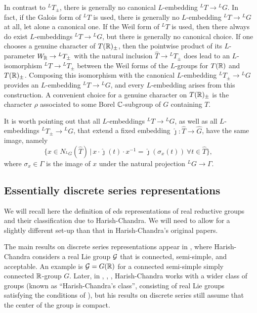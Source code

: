 \documentclass{article}
\theoremstyle{definition}
\numberwithin{equation}{section}
\renewcommand{\-}{\hyp{}}
\begin{document}
In contrast to $^LT_\pm$, there is generally no canonical $L$\-embedding $^LT \to {^LG}$. In fact, if the Galois form of $^LT$ is used, there is generally no $L$\-embedding $^LT \to {^LG}$ at all, let alone a canonical one. If the Weil form of $^LT$ is used, then there always do exist $L$\-embeddings $^LT \to {^LG}$, but there is generally no canonical choice. If one chooses a genuine character of $T(\mathbb{R})_\pm$, then the pointwise product of its $L$\-parameter $W_{\mathbb{R}} \to {^LT_\pm}$ with the natural inclusion $\hat T \to {^LT_\pm}$ does lead to an $L$\-isomorphism $^LT \to {^LT_\pm}$ between the Weil forms of the $L$\-groups for $T(\mathbb{R})$ and $T(\mathbb{R})_\pm$. Composing this isomorphism with the canonical $L$\-embedding $^LT_\pm \to {^LG}$ provides an $L$\-embedding $^LT \to {^LG}$, and every $L$\-embedding arises from this construction. A convenient choice for a genuine character on $T(\mathbb{R})_\pm$ is the character $\rho$ associated to some Borel $\mathbb{C}$-subgroup of $G$ containing $T$.

It is worth pointing out that all $L$\-embeddings $^LT \to {^LG}$, as well as all $L$\-embeddings $^LT_\pm \to {^LG}$, that extend a fixed embedding $\hat\jmath : \hat T \to \hat G$, have the same image, namely
\begin{equation} \label{eq:lembim}
\{x \in N_{^LG}(\hat T)\,|\, x\cdot\hat\jmath(t)\cdot x^{-1} = \hat\jmath(\sigma_x(t))\ \forall t \in \hat T\},
\end{equation}
where $\sigma_x \in \Gamma$ is the image of $x$ under the natural projection $^LG \to \Gamma$.


\subsection{Essentially discrete series representations} \label{sub:essds}

We will recall here the definition of eds representations of real reductive groups and their classification due to Harish-Chandra. We will need to allow for a slightly different set-up than that in Harish-Chandra's original papers.

The main results on discrete series representations appear in \cite{HCDSI}, where Harish-Chandra considers a real Lie group $\mathcal{G}$ that is connected, semi-simple, and acceptable. An example is $\mathcal{G}=G(\mathbb{R})$ for a connected semi-simple simply connected $\mathbb{R}$-group $G$. Later, in \cite{HC-R1}, \cite{HC-R2}, \cite{HC-R3}, Harish-Chandra works with a wider class of groups (known as ``Harish-Chandra's class'', consisting of real Lie groups satisfying the conditions of \cite[\S3]{HC-R1}), but his results on discrete series still assume that the center of the group is compact. 
\end{document}
